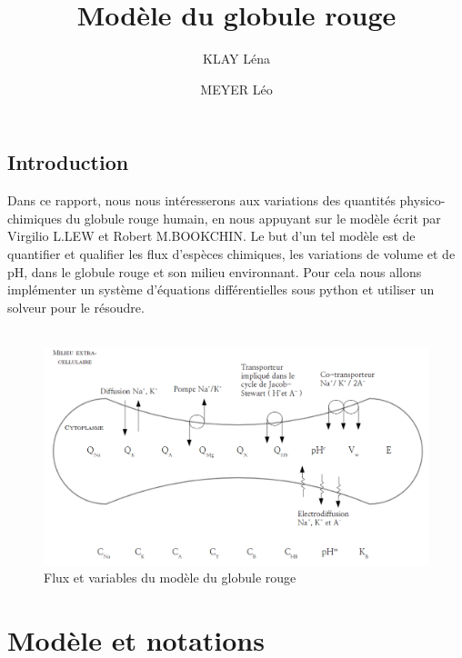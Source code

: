 \documentclass[a4paper,fleqn]{article}
\title{Modèle du globule rouge}           %
\author{KLAY Léna \and MEYER Léo}
\date{}                       %
\begin{document}
\maketitle                    %


\subsection*{Introduction}

Dans ce rapport, nous nous intéresserons aux variations des quantités physico-chimiques  du globule rouge humain, en nous appuyant sur le modèle écrit par Virgilio L.LEW et Robert M.BOOKCHIN. Le but d'un tel modèle est de quantifier et qualifier les flux d'espèces chimiques, les variations de volume et de pH, dans le globule rouge et son milieu environnant. Pour cela nous allons implémenter un système d'équations différentielles sous python et utiliser un solveur pour le résoudre.\\
\\

\begin{figure}[H]
\centering 
\includegraphics[width=\textwidth]{globule_rouge.png}
\caption{Flux et variables du modèle du globule rouge}
\end{figure} 


\newpage

\tableofcontents              %

\newpage


\section{Modèle et notations}               %
\end{document}
